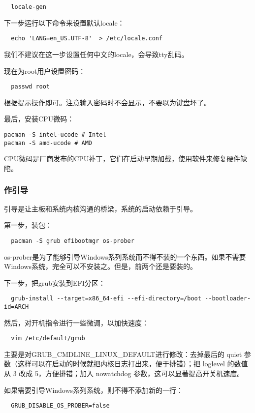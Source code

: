 \documentclass[../main.tex]{subfiles}
\begin{document}
\begin{lstlisting}
  locale-gen
\end{lstlisting}

下一步运行以下命令来设置默认locale：
\begin{lstlisting}
  echo 'LANG=en_US.UTF-8'  > /etc/locale.conf
\end{lstlisting}
我们不建议在这一步设置任何中文的locale，会导致tty乱码。

现在为root用户设置密码：
\begin{lstlisting}
  passwd root
\end{lstlisting}
根据提示操作即可。注意输入密码时不会显示，不要以为键盘坏了。

最后，安装CPU微码：
\begin{lstlisting}
pacman -S intel-ucode # Intel
pacman -S amd-ucode # AMD
\end{lstlisting}
CPU微码是厂商发布的CPU补丁，它们在启动早期加载，使用软件来修复硬件缺陷。

\subsubsection{作引导}

引导是让主板和系统内核沟通的桥梁，系统的启动依赖于引导。

第一步，装包：
\begin{lstlisting}
  pacman -S grub efibootmgr os-prober
\end{lstlisting}
os-prober是为了能够引导Windows系列系统而不得不装的一个东西。如果不需要Windows系统，完全可以不安装之。但是，前两个还是要装的。

下一步，把grub安装到EFI分区：
\begin{lstlisting}
  grub-install --target=x86_64-efi --efi-directory=/boot --bootloader-id=ARCH
\end{lstlisting}

然后，对开机指令进行一些微调，以加快速度：
\begin{lstlisting}
  vim /etc/default/grub
\end{lstlisting}
主要是对GRUB\_CMDLINE\_LINUX\_DEFAULT进行修改：去掉最后的 quiet 参数（这样可以在启动的时候就把内核日志打出来，便于排错）；把 loglevel 的数值从 3 改成 5，方便排错；加入 nowatchdog 参数，这可以显著提高开关机速度。

如果需要引导Windows系列系统，则不得不添加新的一行：
\begin{lstlisting}
  GRUB_DISABLE_OS_PROBER=false
\end{lstlisting}
\end{document}
